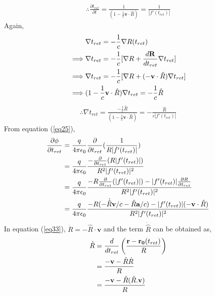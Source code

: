 \documentclass[11pt,a4paper]{article}
\begin{document}
\begin{align}
    \therefore \boxed{\frac{\partial t_{ret}}{\partial t} = \frac{1}{(1 - \frac{1}{c} \mathbf{v}\cdot \hat{R})} =  \frac{1}{|f'(t_{ret})|}} \label{eq31}
\end{align}
Again,
\begin{align}
    & \nabla t_{ret} = -\frac{1}{c} \nabla R (t_{ret}) \notag \\
    \implies & \nabla t_{ret} = -\frac{1}{c} [\nabla R +\frac{d\mathbf{R}}{dt_{ret}}\nabla t_{ret}] \notag \\
    \implies & \nabla t_{ret} = -\frac{1}{c} [\nabla R +(-\mathbf{v}\cdot \hat{R})\nabla t_{ret}] \notag \\
    \implies & (1 - \frac{1}{c} \mathbf{v}\cdot \hat{R}) \nabla t_{ret} = -\frac{1}{c} \hat{R} \notag 
\end{align}
\begin{align}
    \therefore \boxed{\nabla t_{ret} = \frac{-\frac{1}{c} \hat{R}}{(1 - \frac{1}{c} \mathbf{v}\cdot \hat{R})} = -\frac{\hat{R}}{c|f'(t_{ret})|}} \label{32}
\end{align}
From equation (\ref{eq25}),
\begin{align}
    \frac{\partial \phi}{\partial t_{ret}} &= \frac{q}{4\pi \epsilon_0} \frac{\partial}{\partial t_{ret}}(\frac{1}{R|f'(t_{ret})|}) \notag \\
                                           &= \frac{q}{4\pi \epsilon_0} \frac{-\frac{\partial}{\partial t_{ret}}(R|f'(t_{ret})|)}{R^2|f'(t_{ret})|^2} \notag \\
                                           &= \frac{q}{4\pi \epsilon_0} \frac{-R\frac{\partial}{\partial t_{ret}}(|f'(t_{ret})|) - |f'(t_{ret})|\frac{\partial R}{\partial t_{ret}}}{R^2|f'(t_{ret})|^2} \notag \\
                                           &= \frac{q}{4\pi \epsilon_0} \frac{-R(-\dot{\hat{R}}\mathbf{v}/c - \hat{R}\mathbf{a}/c) - |f'(t_{ret})|(-\mathbf{v}\cdot \hat{R})}{R^2|f'(t_{ret})|^2} \label{eq33} 
\end{align}
In equation (\ref{eq33}), $\dot{R} = -\hat{R}\cdot \mathbf{v}$ and the term $\dot{\hat{R}}$ can be obtained as,
\begin{align}
    \hat{R} &= \frac{d}{dt_{ret}}\left(\frac{\mathbf{r} - \mathbf{r_0}(t_{ret})}{R}\right) \notag \\
            &= \frac{-\mathbf{v}-\hat{R}\dot{R}}{R} \notag \\
            &= \frac{-\mathbf{v}-\hat{R}(\hat{R}.\mathbf{v})}{R} \label{eq34}
\end{align}
\end{document}
